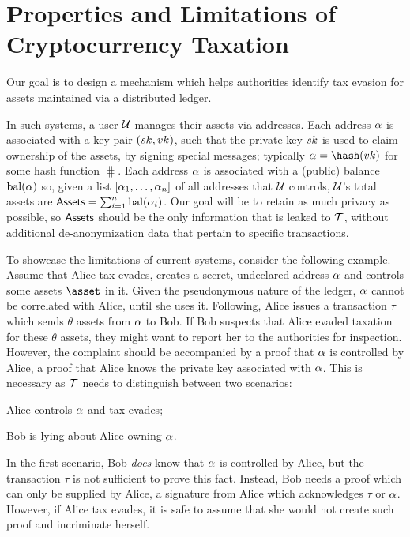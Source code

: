 \section{Properties and Limitations of Cryptocurrency Taxation}\label{sec:taxation}

Our goal is to design a mechanism which helps authorities identify tax evasion
for assets maintained via a distributed ledger.

In such systems, a user $\mathcal{U}$ manages their assets via addresses. Each
address $\alpha$ is associated with a key pair $(sk_{}, vk_{})$, such that the
private key $sk$ is used to claim ownership of the assets, \eg by signing
special messages; typically $\address = \hash(\verifykey)$ for some hash
function $\hash$. Each address $\alpha$ is associated with a (public) balance
$\text{bal}(\alpha)$ so, given a list $[\alpha_1, \dots, \alpha_n]$ of all
addresses that $\mathcal{U}$ controls, $\mathcal{U}$'s total assets are $\mathsf{Assets} =
\sum_{i=1}^n \text{bal}(\alpha_i)$. Our goal will be to retain as much privacy
as possible, so $\mathsf{Assets}$ should be the only information that is leaked to
$\mathcal{T}$, without additional de-anonymization data that pertain to specific
transactions.

To showcase the limitations of current systems, consider the following example.
Assume that Alice tax evades, \ie creates a secret, undeclared address
$\alpha$ and controls some assets $\asset$ in it. Given the pseudonymous
nature of the ledger, $\alpha$ cannot be correlated with Alice, until she
uses it. Following, Alice issues a transaction $\tau$ which sends $\theta$
assets from $\alpha$ to Bob. If Bob suspects that Alice evaded taxation for
these $\theta$ assets, they might want to report her to the authorities for
inspection. However, the complaint should be accompanied by a proof that
$\alpha$ is controlled by Alice, \ie a proof that Alice knows the private key
associated with $\alpha$. This is necessary as $\mathcal{T}$ needs to
distinguish between two scenarios:
\begin{inparaenum}[i)]
    \item Alice controls $\alpha$ and tax evades;
    \item Bob is lying about Alice owning $\alpha$.
\end{inparaenum}
In the first scenario, Bob \emph{does} know that $\alpha$ is controlled by
Alice, but the transaction $\tau$ is not sufficient to prove this fact.
Instead, Bob needs a proof which can only be supplied by Alice, \eg a signature
from Alice which acknowledges $\tau$ or $\alpha$. However, if Alice tax
evades, it is safe to assume that she would not create such proof and
incriminate herself.

